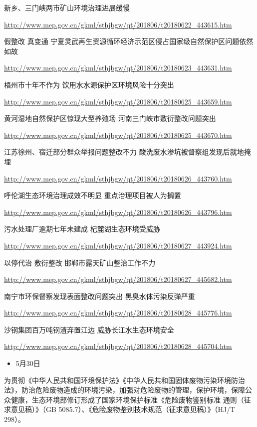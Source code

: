 \documentclass[]{book}
\providecommand{\tightlist}{%
  \setlength{\itemsep}{0pt}\setlength{\parskip}{0pt}}
\begin{document}
新乡、三门峡两市矿山环境治理进展缓慢

\url{http://www.mep.gov.cn/gkml/sthjbgw/qt/201806/t20180622_443615.htm}

假整改 真变通 宁夏灵武再生资源循环经济示范区侵占国家级自然保护区问题依然如故

\url{http://www.mep.gov.cn/gkml/sthjbgw/qt/201806/t20180623_443631.htm}

梧州市十年不作为 饮用水水源保护区环境风险十分突出

\url{http://www.mep.gov.cn/gkml/sthjbgw/qt/201806/t20180625_443659.htm}

黄河湿地自然保护区惊现大型养殖场 河南三门峡市敷衍整改问题突出

\url{http://www.mep.gov.cn/gkml/sthjbgw/qt/201806/t20180625_443670.htm}

江苏徐州、宿迁部分群众举报问题整改不力 酸洗废水渗坑被督察组发现后就地掩埋

\url{http://www.mep.gov.cn/gkml/sthjbgw/qt/201806/t20180626_443760.htm}

呼伦湖生态环境治理成效不明显 重点治理项目被人为搁置

\url{http://www.mep.gov.cn/gkml/sthjbgw/qt/201806/t20180626_443796.htm}

污水处理厂逾期七年未建成 杞麓湖生态环境受威胁

\url{http://www.mep.gov.cn/gkml/sthjbgw/qt/201806/t20180627_443924.htm}

以停代治 敷衍整改 邯郸市露天矿山整治工作不力

\url{http://www.mep.gov.cn/gkml/sthjbgw/qt/201806/t20180627_445682.htm}

南宁市环保督察发现表面整改问题突出 黑臭水体污染反弹严重

\url{http://www.mep.gov.cn/gkml/sthjbgw/qt/201806/t20180628_445776.htm}

沙钢集团百万吨钢渣弃置江边 威胁长江水生态环境安全

\url{http://www.mep.gov.cn/gkml/sthjbgw/qt/201806/t20180628_445704.htm}

\begin{itemize}
\tightlist
\item
  5月30日
\end{itemize}

为贯彻《中华人民共和国环境保护法》《中华人民共和国固体废物污染环境防治法》，防治危险废物造成的环境污染，加强对危险废物的管理，保护环境，保障公众健康，生态环境部修订形成了国家环境保护标准《危险废物鉴别标准 通则（征求意见稿）》（GB 5085.7）、《危险废物鉴别技术规范（征求意见稿）》（HJ/T 298）。
\end{document}
